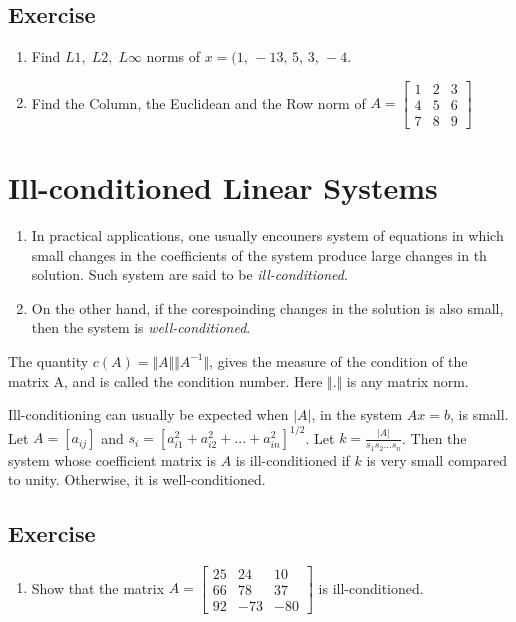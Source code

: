 \documentclass[aima203_lecturenotes_ku.tex]{subfiles}
\begin{document}
\subsection{Exercise}
\begin{enumerate}
\item Find $L1, \; L2, \; L\infty$ norms of $x=(1,\,-13,\,5,\,3,\,-4$.
\item Find the Column, the Euclidean and the Row norm of $A =
  \begin{bmatrix}
    1 & 2 & 3 \\
    4 & 5 & 6 \\
    7 & 8 & 9
  \end{bmatrix}
  $
\end{enumerate}

\section{Ill-conditioned Linear Systems}
 \begin{enumerate}
 \item In practical applications, one usually encouners system of equations in which small changes in the coefficients of the system produce large changes in th solution. Such system are said to be \textit{ill-conditioned}.

\item On the other hand, if the corespoinding changes in the solution is also small, then the system is \textit{well-conditioned}.
\end{enumerate}

\begin{definition}
  The quantity $c(A) = \Vert A \Vert \Vert A^{-1} \Vert$, gives the measure of the condition of the matrix A, and is called the condition number. Here $\Vert . \Vert$ is any matrix norm.
\end{definition}
Ill-conditioning can usually be expected when $|A|$, in the system $Ax=b$, is small. Let $A=[a_{ij}]$ and $\displaystyle s_i = \left [ a^2_{i1} + a^2_{i2} + ... + a^2_{in} \right ] ^{1/2}$. Let $\displaystyle k = \frac{|A|}{s_1s_2...s_n}$. Then the system whose coefficient matrix is $A$ is ill-conditioned if $k$ is very small compared to unity. Otherwise, it is well-conditioned.

  \subsection{Exercise}
  \begin{enumerate}
  \item Show that the matrix $A=   \begin{bmatrix}
    25  & 24 & 10 \\
    66 & 78 & 37 \\
    92 & -73 & -80
  \end{bmatrix}
  $ is ill-conditioned.
  \end{enumerate}
\end{document}
